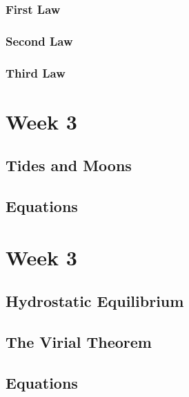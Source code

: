 \documentclass[a4paper,10pt]{article}
\begin{document}
\subsubsection{First Law}
\subsubsection{Second Law}
\subsubsection{Third Law}


\newpage
\section{Week 3}

\subsection{Tides and Moons}

\subsection{Equations}


\newpage
\section{Week 3}

\subsection{Hydrostatic Equilibrium}

\subsection{The Virial Theorem}

\subsection{Equations}


\end{document}
